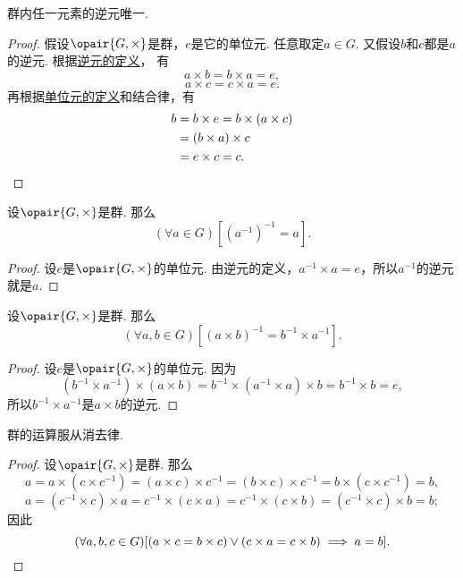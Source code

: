 \begin{theorem}\label{theorem:抽象代数.群内任一元的逆元唯一}
群内任一元素的逆元唯一.
\begin{proof}
假设\(\opair{G,\times}\)是群，\(e\)是它的单位元.
任意取定\(a \in G\).
又假设\(b\)和\(c\)都是\(a\)的逆元.
根据\hyperref[definition:抽象代数.群的定义]{逆元的定义}，
有\[
    a \times b = b \times a = e,
\]\[
    a \times c = c \times a = e.
\]
再根据\hyperref[definition:抽象代数.幺半群的定义]{单位元的定义}和结合律，有\begin{align*}
    b &= b \times e
	= b \times (a \times c) \\
    &= (b \times a) \times c \\
    &= e \times c
	= c.
	\qedhere
\end{align*}
\end{proof}
\end{theorem}

\begin{theorem}\label{theorem:抽象代数.群内任一元的逆的逆是它本身}
设\(\opair{G,\times}\)是群.
那么\[
	(\forall a\in G)[(a^{-1})^{-1}=a].
\]
\begin{proof}
设\(e\)是\(\opair{G,\times}\)的单位元.
由逆元的定义，\(a^{-1} \times a = e\)，所以\(a^{-1}\)的逆元就是\(a\).
\end{proof}
\end{theorem}

\begin{theorem}\label{theorem:抽象代数.群内元素的乘积的逆}
设\(\opair{G,\times}\)是群.
那么\[
	(\forall a,b\in G)[
		(a \times b)^{-1}
		= b^{-1} \times a^{-1}
	].
\]
\begin{proof}
设\(e\)是\(\opair{G,\times}\)的单位元.
因为\[
	(b^{-1} \times a^{-1})\times(a \times b)
	= b^{-1} \times (a^{-1} \times a) \times b
	= b^{-1} \times b
	= e,
\]
所以\(b^{-1} \times a^{-1}\)是\(a \times b\)的逆元.
\end{proof}
\end{theorem}

\begin{theorem}\label{theorem:抽象代数.群的运算服从消去律}
群的运算服从消去律.
\begin{proof}
设\(\opair{G,\times}\)是群.
那么\[
	a=a\times(c\times c^{-1})
	=(a\times c)\times c^{-1}=(b\times c)\times c^{-1}
	=b\times(c\times c^{-1})
	=b,
\]\[
	a=(c^{-1}\times c)\times a
	= c^{-1}\times(c\times a)
	= c^{-1}\times(c\times b)
	= (c^{-1}\times c)\times b
	= b;
\]
因此\[
	(\forall a,b,c\in G)[
		(a\times c=b\times c)\lor(c\times a=c\times b) \implies a=b
	].
	\qedhere
\]
\end{proof}
\end{theorem}

